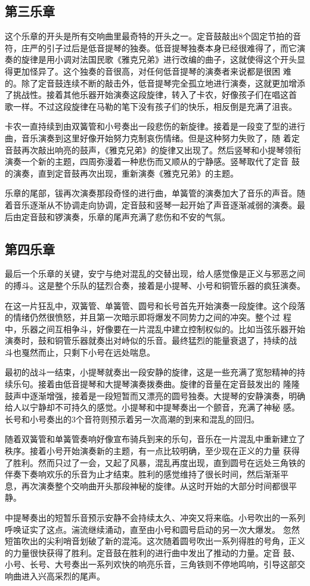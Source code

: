 \documentclass[a4paper,left=2.5cm,right=2.5cm,11pt]{article}
\begin{document}
\subsection{第三乐章}
	这个乐章的开头是所有交响曲里最奇特的开头之一。定音鼓敲出8个固定节拍的音符，庄严的引子过后是低音提琴的独奏。低音提琴独奏本身已经很难得了，而它演奏的旋律是用小调对法国民歌《雅克兄弟》进行改编的曲子，这就使得这个开头显得更加怪异了。这个独奏的音很高，对任何低音提琴的演奏者来说都是很困 难的。除了定音鼓连续不断的敲击外，低音提琴完全孤立地进行演奏，这就更加增添了挑战性。接着其他乐器开始演奏这段旋律，转入了卡农，好像孩子们在唱这首 歌一样。不过这段旋律在马勒的笔下没有孩子们的快乐，相反倒是充满了沮丧。\par
	卡农一直持续到由双簧管和小号奏出一段悲伤的新旋律。接着是一段变了型的进行曲，音乐演奏到这里好像开始努力克制哀伤情绪。但是这种努力失败了，随 着定音鼓再次敲出响亮的鼓声，《雅克兄弟》的旋律又出现了。然后竖琴和小提琴领衔演奏一个新的主题，四周弥漫着一种悲伤而又顺从的宁静感。竖琴取代了定音 鼓的演奏，直到定音鼓再次出现，重新演奏《雅克兄弟》的主题。\par
	乐章的尾部，钹再次演奏那段奇怪的进行曲，单簧管的演奏加大了音乐的声音。随着音乐逐渐从不协调走向协调，定音鼓和竖琴一起开始了声音逐渐减弱的演奏。最后由定音鼓和锣演奏，乐章的尾声充满了悲伤和不安的气氛。
	
\subsection{第四乐章}
	最后一个乐章的关键，安宁与绝对混乱的交替出现，给人感觉像是正义与邪恶之间的搏斗。这是整个乐队的猛烈合奏，接着是小提琴、小号和铜管乐器的疯狂演奏。\par
	在这一片狂乱中，双簧管、单簧管、圆号和长号首先开始演奏一段旋律。这个段落的情绪仍然很愤怒，并且第一次暗示即将爆发不同势力之间的冲突。整个过 程中，乐器之间互相争斗，好像要在一片混乱中建立控制权似的。比如当弦乐器开始演奏时，鼓和铜管乐器就奏出对峙似的乐音。最终猛烈的能量衰退了，持续的战 斗也戛然而止，只剩下小号在远处喘息。\par
	最初的战斗一结束，小提琴就奏出一段安静的旋律，这是一些充满了宽恕精神的持续乐句。接着由低音提琴和大提琴演奏拨奏曲。旋律的音量在定音鼓发出的 隆隆鼓声中逐渐增强，接着是一段短暂而又漂亮的圆号独奏。大提琴的安静演奏，明确给人以宁静却不可持久的感觉。小提琴和中提琴奏出一个颤音，充满了神秘 感。长号和小号奏出的3个音符则预示着另一次高潮的到来和混乱的回归。\par
	随着双簧管和单簧管奏响好像宣布骑兵到来的乐句，音乐在一片混乱中重新建立了秩序。接着小号开始演奏新的主题，有一点比较明确，至少现在正义的力量 获得了胜利。然而只过了一会，又起了风暴，混乱再度出现，直到圆号在远处三角铁的伴奏下奏响欢乐的乐音为止才结束。胜利的感觉维持了很长时间，然后渐渐平 息，再次演奏整个交响曲开头那段神秘的旋律。从这时开始的大部分时间都很平静。\par
	中提琴奏出的短暂乐音预示安静不会持续太久、冲突又将来临。小号吹出的一系列呼唤证实了这点。湍流继续涌动，直至由小号和圆号启动的另一次大爆发。 忽然短笛吹出的尖利哨音划破了新的混沌。这次随着圆号吹出一系列得胜的号角，正义的力量很快获得了胜利。定音鼓在胜利的进行曲中发出了推动的力量。定音 鼓、小号、长号、大号奏出一系列欢快的响亮乐音，三角铁则不停地鸣响，引导这部交响曲进入兴高采烈的尾声。
\end{document}
